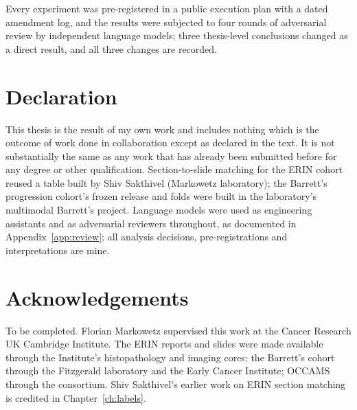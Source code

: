 Every experiment was pre-registered in a public execution plan with a dated amendment log, and the results were subjected to four rounds of adversarial review by independent language models; three thesis-level conclusions changed as a direct result, and all three changes are recorded.

\chapter*{Declaration}
This thesis is the result of my own work and includes nothing which is the outcome of work done in collaboration except as declared in the text. It is not substantially the same as any work that has already been submitted before for any degree or other qualification. Section-to-slide matching for the ERIN cohort reused a table built by Shiv Sakthivel (Markowetz laboratory); the Barrett's progression cohort's frozen release and folds were built in the laboratory's multimodal Barrett's project. Language models were used as engineering assistants and as adversarial reviewers throughout, as documented in Appendix~\ref{app:review}; all analysis decisions, pre-registrations and interpretations are mine.

\chapter*{Acknowledgements}
To be completed. Florian Markowetz supervised this work at the Cancer Research UK Cambridge Institute. The ERIN reports and slides were made available through the Institute's histopathology and imaging cores; the Barrett's cohort through the Fitzgerald laboratory and the Early Cancer Institute; OCCAMS through the consortium. Shiv Sakthivel's earlier work on ERIN section matching is credited in Chapter~\ref{ch:labels}.
